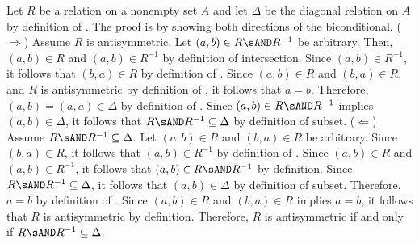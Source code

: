 \begin{enumerate}
\begin{enumerate}
      \begin{subprove}
        Let $R$ be a relation on a nonempty set $A$ and let $\Delta$ be the diagonal relation on $A$ by definition of .
        The proof is by showing both directions of the biconditional.
        \proofstep
        ($\Rightarrow$) Assume $R$ is antisymmetric. Let $(a,b) \in R \sAND R^{-1}$ be arbitrary. 
        Then, $(a,b) \in R$ and $(a,b) \in R^{-1}$ by definition of intersection. 
        Since $(a,b) \in R^{-1}$, it follows that $(b,a) \in R$ by definition of . 
        Since $(a,b) \in R$ and $(b,a) \in R$, and $R$ is antisymmetric by definition of , 
        it follows that $a = b$. Therefore, $(a,b) = (a,a) \in \Delta$ by definition of .
        Since $(a,b) \in R \sAND R^{-1}$ implies $(a,b) \in \Delta$, it follows that $R \sAND R^{-1} \subseteq \Delta$ by definition of subset.
        \proofstep
        ($\Leftarrow$) Assume $R \sAND R^{-1} \subseteq \Delta$. Let $(a,b) \in R$ and $(b,a) \in R$ be arbitrary. 
        Since $(b,a) \in R$, it follows that $(a,b) \in R^{-1}$ by definition of . 
        Since $(a,b) \in R$ and $(a,b) \in R^{-1}$, it follows that $(a,b) \in R \sAND R^{-1}$ by definition. 
        Since $R \sAND R^{-1} \subseteq \Delta$, it follows that $(a,b) \in \Delta$ by definition of subset. 
        Therefore, $a = b$ by definition of . 
        Since $(a,b) \in R$ and $(b,a) \in R$ implies $a = b$, it follows that $R$ is antisymmetric by definition.
        \proofstep
        Therefore, $R$ is antisymmetric if and only if $R \sAND R^{-1} \subseteq \Delta$.
      \end{subprove}
  \end{enumerate}



\end{enumerate}
